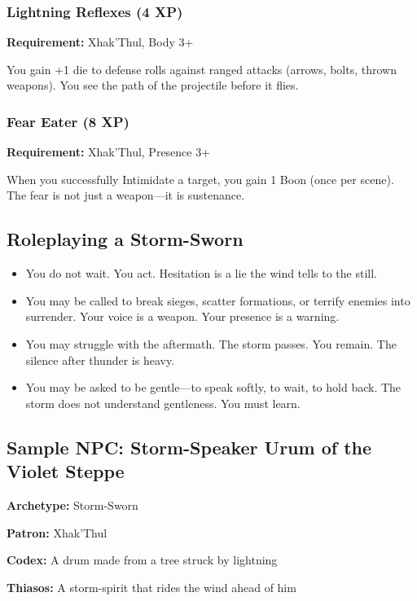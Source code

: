 \subsubsection{Lightning Reflexes (4 XP)}

\textbf{Requirement:} Xhak'Thul, Body 3+

You gain +1 die to defense rolls against ranged attacks (arrows, bolts, thrown weapons). You see the path of the projectile before it flies.

\subsubsection{Fear Eater (8 XP)}

\textbf{Requirement:} Xhak'Thul, Presence 3+

When you successfully Intimidate a target, you gain 1 Boon (once per scene). The fear is not just a weapon—it is sustenance.

\subsection{Roleplaying a Storm-Sworn}

\begin{itemize}
\item You do not wait. You act. Hesitation is a lie the wind tells to the still.
\item You may be called to break sieges, scatter formations, or terrify enemies into surrender. Your voice is a weapon. Your presence is a warning.
\item You may struggle with the aftermath. The storm passes. You remain. The silence after thunder is heavy.
\item You may be asked to be gentle—to speak softly, to wait, to hold back. The storm does not understand gentleness. You must learn.
\end{itemize}

\subsection{Sample NPC: Storm-Speaker Urum of the Violet Steppe}

\textbf{Archetype:} Storm-Sworn

\textbf{Patron:} Xhak'Thul

\textbf{Codex:} A drum made from a tree struck by lightning

\textbf{Thiasos:} A storm-spirit that rides the wind ahead of him

